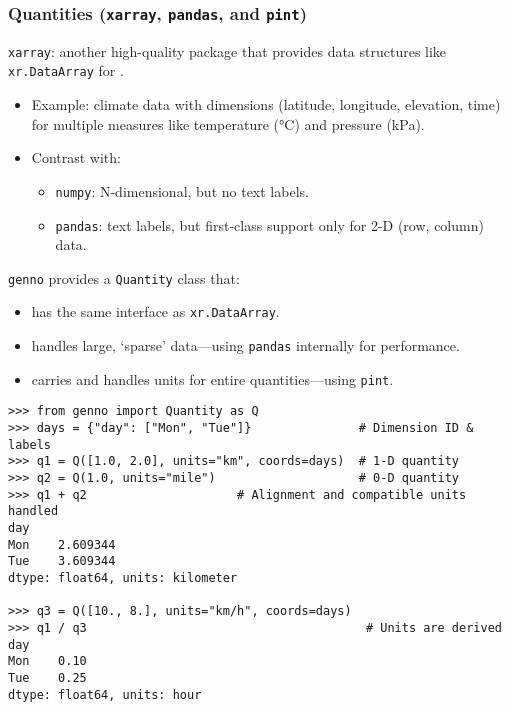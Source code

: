 \documentclass[12pt,aspectratio=169]{beamer}
\renewcommand{\mod}[1]{\texttt{#1}}
\newcommand{\py}[1]{\texttt{#1}}
\begin{document}
\begin{frame}
\frametitle{Quantities (\texttt{xarray}, \texttt{pandas}, and \texttt{pint})}

\mod{xarray}: another high-quality package that provides data structures like \py{xr.DataArray}
for .
\begin{itemize}
  \item Example: climate data with dimensions (latitude, longitude, elevation, time)
    for multiple measures like temperature (°C) and pressure (kPa).
  \item Contrast with:
    \begin{itemize}
      \item \mod{numpy}: N-dimensional, but no text labels.
      \item \mod{pandas}: text labels, but first-class support only for 2-D (row, column) data.
    \end{itemize}
\end{itemize}

\medskip\pause
\mod{genno} provides a \py{Quantity} class that:
\begin{itemize}
  \item has the same interface as \py{xr.DataArray}.
  \item handles large, ‘sparse' data—using \mod{pandas} internally for performance.
  \item carries and handles units for entire quantities—using \mod{pint}.
\end{itemize}
\end{frame}


\begin{frame}

\begin{verbatim}
>>> from genno import Quantity as Q
>>> days = {"day": ["Mon", "Tue"]}               # Dimension ID & labels
>>> q1 = Q([1.0, 2.0], units="km", coords=days)  # 1-D quantity
>>> q2 = Q(1.0, units="mile")                    # 0-D quantity
>>> q1 + q2                     # Alignment and compatible units handled
day
Mon    2.609344
Tue    3.609344
dtype: float64, units: kilometer

>>> q3 = Q([10., 8.], units="km/h", coords=days)
>>> q1 / q3                                       # Units are derived
day
Mon    0.10
Tue    0.25
dtype: float64, units: hour
\end{verbatim}

\end{frame}
\end{document}
